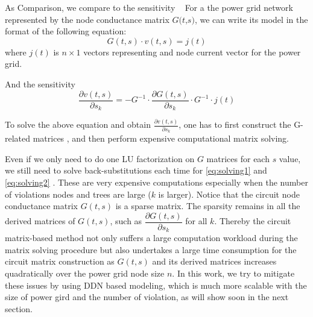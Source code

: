 As Comparison, we compare to the sensitivity ~\cite{Sukharev:2019pg}
For a the power grid network represented by the node conductance matrix $ \textit{G(t,s)}$, we can write its model in the format of the following equation:
\begin{equation}
	\label{eq:gv=i}
	G(t,s)\cdot v(t,s)= j(t)
\end{equation}
where $j(t)$  is $n\times 1$ vectors representing and node current vector for the power grid.

And the sensitivity 
\begin{equation}
	\label{eq:dVs}
	\dfrac{\partial v(t,s)}{\partial s_{k}} = -G^{-1}\cdot \dfrac{\partial G(t,s)}{\partial s_{k}}  \cdot G^{-1}\cdot j(t)
\end{equation}




To solve the above equation and obtain $ \frac{\partial v(t,s)}{\partial s_{k}}$, one has to first construct the G-related matrices , and then perform expensive computational matrix solving. 


Even if we only need to do one LU factorization on $G$ matrices for each $s$ value, we still need to solve back-substitutions each time for \eqref{eq:solving1} and \eqref{eq:solving2} . These are very expensive computations especially when the number of violations nodes and trees are large ($k$ is larger).
Notice that the circuit node conductance matrix $G(t,s)$ is a sparse matrix. The sparsity remains in all the derived matrices of $G(t,s)$, such as $\dfrac{\partial G(t,s)}{\partial s_{k}}$ for all $k$.
Thereby the circuit matrix-based method not only suffers a large computation workload during the matrix solving procedure but also undertakes a large time consumption for the circuit matrix construction as $G(t,s)$ and its derived matrices increases quadratically over the power grid node size $n$. In this work, we try to mitigate these issues by using DDN based modeling, which is much more scalable with the size of power gird and the number of violation, as will show soon in the next section. 


